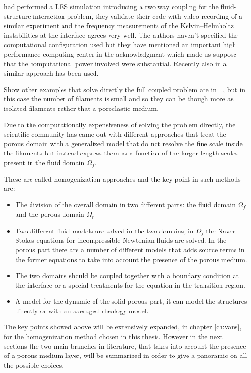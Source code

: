 \citet{dupont2010modelling} had performed a LES simulation introducing a two way coupling for the fluid-structure interaction problem, they validate their code with video recording of a similar experiment and the frequency measurements of the Kelvin–Helmholtz instabilities at the interface agrees very well.
The authors haven't specified the computational configuration used but they have mentioned an important high performance computing center in the acknowledgment which made us suppose that the computational power involved were substantial.
Recently also in \citet{marjoribanks2017does} a similar approach has been used.

Show other examples that solve directly the full coupled problem are in \citet{pinelli2017pelskin}, \citet{favier2017pelskin}, \citet{revell2017pelskin} but in this case the number of filaments is small and so they can be though more as isolated filaments rather that a poroelastic medium.

Due to the computationally expensiveness of solving the problem directly, the scientific community has came out with different approaches that treat the porous domain with a generalized model that do not resolve the fine scale inside the filaments but instead express them as a function of the larger length scales present in the fluid domain $\Omega_{f}$.

These are called homogenization approaches and the key point in such methods are:
\begin{itemize}
	\item The division of the overall domain in two different parts: the fluid domain $\Omega_{f}$ and the porous domain $\Omega_{p}$
	\item Two different fluid models are solved in the two domains, in $\Omega_{f}$ the Naver-Stokes equations for incompressible Newtonian fluids are solved. In the porous part there are a number of different models that adds source terms in the former equations to take into account the presence of the porous medium.
	\item The two domains should be coupled together with a boundary condition at the interface or a special treatments for the equation in the transition region.
	\item A model for the dynamic of the solid porous part, it can model the structures directly or with an averaged rheology model.
\end{itemize}

The key points showed above will be extensively expanded, in chapter \ref{ch:vans}, for the homogenization method chosen in this thesis.
However in the next sections the two main branches in literature, that takes into account the presence of a porous medium layer, will be summarized in order to give a panoramic on all the possible choices.


